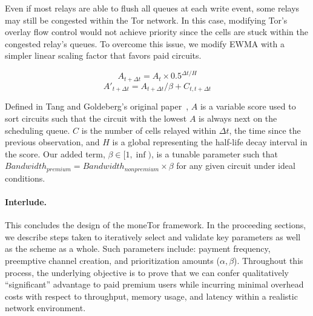Even if most relays are able to flush all queues at each write event, some
relays may still be congested within the Tor network. In this case, modifying
Tor's overlay flow control would not achieve priority since the cells are stuck
within the congested relay's queues. To overcome this issue, we modify EWMA with
a simpler linear scaling factor that favors paid circuits.

\begin{equation}
  A_{t + \Delta t} = A_t \times 0.5^{\Delta t/H}
\end{equation}
\begin{equation}
  A'_{t + \Delta t} = A_{t + \Delta t} / \beta + C_{t, t + \Delta t}
\end{equation}

Defined in Tang and Goldeberg's original paper~\cite{tang2010improved}, $A$ is a
variable score used to sort circuits such that the circuit with the lowest $A$
is always next on the scheduling queue. $C$ is the number of cells relayed
within $\Delta t$, the time since the previous observation, and $H$ is a global
representing the half-life decay interval in the score. Our added term, $\beta
\in [1, \inf)$, is a tunable parameter such that $Bandwidth_{premium} =
  Bandwidth_{nonpremium} \times \beta$ for any given circuit under ideal
  conditions.


\paragraph*{Interlude.} This concludes the design of the moneTor framework. In
the proceeding sections, we describe steps taken to iteratively select and
validate key parameters as well as the scheme as a whole. Such parameters
include: payment frequency, preemptive channel creation, and prioritization
amounts ($\alpha, \beta$). Throughout this process, the underlying objective is
to prove that we can confer qualitatively ``significant'' advantage to paid
premium users while incurring minimal overhead costs with respect to throughput,
memory usage, and latency within a realistic network environment.



